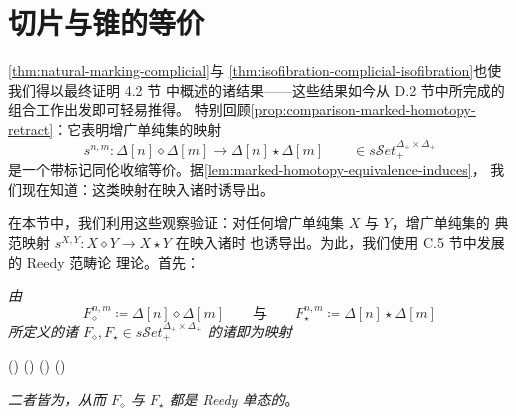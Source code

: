 
\providecommand{\sSet}{s\mathcal{S}et}%
\providecommand{\qcOne}{\mathbf{1}}%
\providecommand{\qcTwo}{\mathbf{2}}%

\section{切片与锥的等价}\label{sec:equivalence-of-slices-and-cones}

\cref{thm:natural-marking-complicial}与%
\cref{thm:isofibration-complicial-isofibration}也使我们得以最终证明 4.2 节
中概述的诸结果——这些结果如今从 D.2 节中所完成的组合工作出发即可轻易推得。
特别回顾\cref{prop:comparison-marked-homotopy-retract}：它表明增广单纯集的映射
\begin{equation*}
s^{n,m}\colon\Delta[n]\diamond\Delta[m]\longrightarrow\Delta[n]\star\Delta[m]
\qquad\in\sSet_{+}^{\Delta_{+}\times\Delta_{+}}
\end{equation*}
是一个带标记同伦收缩等价。据\cref{lem:marked-homotopy-equivalence-induces}，
我们现在知道：这类映射在映入诸\trQuasiCategory{}时诱导出\trEquivalence。

在本节中，我们利用这些观察验证：对任何增广单纯集 $X$ 与 $Y$，增广单纯集的
典范映射 $s^{X,Y}\colon X\diamond Y\to X\star Y$ 在映入诸\trQuasiCategory{}时
也诱导出\trEquivalence。为此，我们使用 C.5 节中发展的 Reedy 范畴论\trHomotopy{}%
理论。首先：

\begin{lemma}[\trLatchingMap]\label{lem:latching-maps-join-fat-join}
\emph{由
\begin{equation*}
F_{\diamond}^{n,m}\coloneqq\Delta[n]\diamond\Delta[m]
\qquad\text{与}\qquad
F_{\star}^{n,m}\coloneqq\Delta[n]\star\Delta[m]
\end{equation*}
所定义的诸\trDiagram{} $F_{\diamond},F_{\star}\in\sSet_{+}^{\Delta_{+}\times\Delta_{+}}$
的诸\trLatchingMap{}即为映射}
\begin{rveq}\label{eq:latching-maps}
\bigl(\partial\Delta[n]\hookrightarrow\Delta[n]\bigr)\mathbin{\hat{\diamond}}
\bigl(\partial\Delta[m]\hookrightarrow\Delta[m]\bigr)
\qquad{}\qquad
\bigl(\partial\Delta[n]\hookrightarrow\Delta[n]\bigr)\mathbin{\hat{\star}}
\bigl(\partial\Delta[m]\hookrightarrow\Delta[m]\bigr)
\end{rveq}
\emph{二者皆为\trMonomorphism{}，从而 $F_{\diamond}$ 与 $F_{\star}$ 都是 Reedy
单态的}。
\end{lemma}

